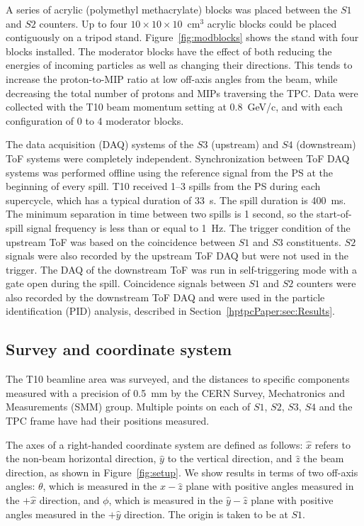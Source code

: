 A series of acrylic (polymethyl methacrylate) blocks was placed between the $\mathit{S1}$ and $\mathit{S2}$ counters.
Up to four $10\times10\times10$~cm$^3$ acrylic blocks could be placed contiguously on a tripod stand.
Figure~\ref{fig:modblocks} shows the stand with four blocks installed.
The moderator blocks have the effect of both reducing the energies of incoming particles as well as changing their directions.
This tends to increase the proton-to-MIP ratio at low off-axis angles from the beam, while decreasing the total number of protons and MIPs traversing the TPC.
Data were collected with the T10 beam momentum setting at 0.8~GeV/c, and with each configuration of 0 to 4 moderator blocks.

The data acquisition (DAQ) systems of the $\mathit{S3}$ (upstream) and $\mathit{S4}$ (downstream) ToF systems were completely independent.
Synchronization between ToF DAQ systems was performed offline using the reference signal from the PS at the beginning of every spill.
T10 received 1--3 spills from the PS during each supercycle, which has a typical duration of 33~s.
The spill duration is 400~ms.
The minimum separation in time between two spills is 1 second, so the start-of-spill signal frequency is less than or equal to 1~Hz.
The trigger condition of the upstream ToF was based on the coincidence between $\mathit{S1}$ and $\mathit{S3}$ constituents.
$\mathit{S2}$ signals were also recorded by the upstream ToF DAQ but were not used in the trigger.
The DAQ of the downstream ToF was run in self-triggering mode with a gate open during the spill.
Coincidence signals between $\mathit{S1}$ and $\mathit{S2}$ counters were also recorded by the downstream ToF DAQ and were used in the particle identification (PID) analysis, described in Section~\ref{hptpcPaper:sec:Results}.  

\subsection{Survey and coordinate system}
\label{sec:coord}
The T10 beamline area was surveyed, and the distances to specific components measured with a precision of 0.5~mm by the CERN Survey, Mechatronics and Measurements (SMM) group.
Multiple points on each of $\mathit{S1}$, $\mathit{S2}$, $\mathit{S3}$, $\mathit{S4}$ and the TPC frame have had their positions measured.

The axes of a right-handed coordinate system are defined as follows: $\hat{x}$ refers to the non-beam horizontal direction, $\hat{y}$ to the vertical direction, and $\hat{z}$ the beam direction, as shown in Figure~\ref{fig:setup}.
We show results in terms of two off-axis angles: $\theta$, which is measured in the $\hat{x}-\hat{z}$ plane with positive angles measured in the $+\hat{x}$ direction, and $\phi$, which is measured in the $\hat{y}-\hat{z}$ plane with positive angles measured in the $+\hat{y}$ direction.
The origin is taken to be at $\mathit{S1}$.

